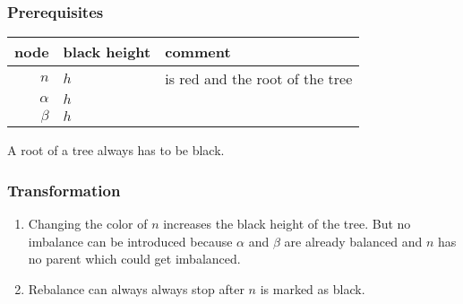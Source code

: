 \documentclass[a4paper,10pt,twoside]{article}
\begin{document}
\subsubsection{Prerequisites}

\begin{center}
\begin{tabular}{|r||l|l|}
\hline
node		&	black height	&	comment	\\
\hline
\hline
$n$		&	$h$	&	is red and the root of the tree	\\\hline
$\alpha$	&	$h$	&		\\\hline
$\beta$		&	$h$	&		\\\hline
\end{tabular}
\end{center}

A root of a tree always has to be black.

\begin{center}
\end{center}

\subsubsection{Transformation}

\begin{enumerate}
\item Changing the color of $n$ increases the black height of the tree. But
no imbalance can be introduced because $\alpha$ and $\beta$ are already balanced
and $n$ has no parent which could get imbalanced.

\begin{center}
\end{center}


\item Rebalance can always always stop after $n$ is marked as black.

\end{enumerate}
\end{document}
